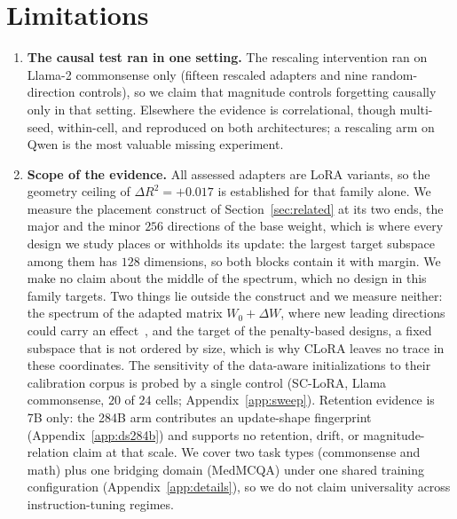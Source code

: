 \documentclass[11pt]{article}
\begin{document}
\section*{Limitations}
\begin{enumerate}
  \item \textbf{The causal test ran in one setting.} The rescaling
        intervention ran on Llama-2 commonsense only (fifteen rescaled
        adapters and nine random-direction controls), so we claim that
        magnitude controls forgetting causally only in that setting.
        Elsewhere the evidence is correlational, though multi-seed,
        within-cell, and reproduced on both architectures; a rescaling arm on
        Qwen is the most valuable missing experiment.
  \item \textbf{Scope of the evidence.} All assessed adapters are LoRA
        variants, so the geometry ceiling of $\Delta R^2 = +0.017$ is
        established for that family alone. We measure the
        placement construct of Section~\ref{sec:related} at its two ends, the
        major and the minor $256$ directions of the base weight, which is
        where every design we study places or withholds its update: the
        largest target subspace among them has $128$ dimensions, so both
        blocks contain it with margin. We make no claim about the middle of
        the spectrum, which no design in this family targets. Two things lie
        outside the construct and we measure neither: the spectrum of the
        adapted matrix $W_0{+}\Delta W$, where new leading directions could
        carry an effect~\citep{shuttleworth2025illusion}, and the target of
        the penalty-based designs, a fixed subspace that is not ordered by
        size, which is why CLoRA leaves no trace in these coordinates. The
        sensitivity of the
        data-aware initializations to their calibration corpus is probed by a
        single control (SC-LoRA, Llama commonsense, $20$ of $24$ cells;
        Appendix~\ref{app:sweep}). Retention evidence is 7B only: the
        284B arm contributes an update-shape fingerprint
        (Appendix~\ref{app:ds284b}) and supports no retention, drift, or
        magnitude-relation claim at that scale. We cover two task types
        (commonsense and math) plus one bridging domain (MedMCQA) under one
        shared training configuration (Appendix~\ref{app:details}), so we do
        not claim universality across instruction-tuning regimes.

\end{enumerate}
\end{document}
